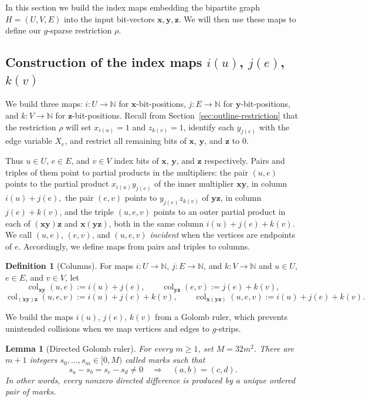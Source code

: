 \documentclass[11pt]{article}
\newtheorem{lemma}[theorem]{Lemma}
\theoremstyle{definition}
\newtheorem{definition}[theorem]{Definition}
\theoremstyle{remark}
\newcommand{\N}{\mathbb{N}}
\newcommand{\col}{\operatorname{col}}
\newcommand{\vv}[1]{\mathbf{#1}}
\begin{document}
In this section we build the index maps embedding the bipartite graph $H=(U,V,E)$ into the input bit-vectors $\vv{x},\vv{y},\vv{z}$. We will then use these maps to define our $g$-sparse restriction $\rho$.

\subsection{Construction of the index maps \texorpdfstring{$i(u)$, $j(e)$, $k(v)$}{i(u), j(e), k(v)}}
\label{sec:embedding}

We build
three maps: $i:U\to\N$ for $\vv{x}$-bit-positions, $j:E\to\N$ for $\vv{y}$-bit-positions, and $k:V\to\N$ for $\vv{z}$-bit-positions. Recall
from Section~\ref{sec:outline-restriction} that the restriction $\rho$ will set $x_{i(u)}=1$ and $z_{k(v)}=1$, identify each $y_{j(e)}$ with
the edge variable $X_e$, and restrict all remaining bits of $\vv{x}$, $\vv{y}$, and $\vv{z}$ to $0$.

Thus $u\in U$, $e\in E$, and $v\in V$ index bits of $\vv{x}$,
$\vv{y}$, and $\vv{z}$ respectively. Pairs and triples of them point to
partial products in the multipliers: the pair $(u,e)$ points to the partial product
$x_{i(u)}y_{j(e)}$ of the inner multiplier $\vv{x}\vv{y}$, in column
$
i(u)+j(e),
$
the pair $(e,v)$ points to $y_{j(e)}z_{k(v)}$ of $\vv{y}\vv{z}$, in
column $j(e)+k(v)$, and the triple $(u,e,v)$
points to an outer partial product in each of $(\vv{x}\vv{y})\vv{z}$
and $\vv{x}(\vv{y}\vv{z})$, both in the same column
$
i(u)+j(e)+k(v).
$
We call $(u,e)$, $(e,v)$, and $(u,e,v)$ \emph{incident} when the vertices are endpoints of $e$.
Accordingly, we define maps from pairs and triples to columns.
\begin{definition}[Columns]
	\label{def:columns}
	For maps $i:U\to\N$, $j:E\to\N$, and $k:V\to\N$ and
	$u\in U$, $e\in E$, and $v\in V$, let
	\[
	\col_{\vv{xy}}(u,e):=i(u)+j(e),\qquad
	\col_{\vv{yz}}(e,v):=j(e)+k(v),
	\]
	\[
	\col_{(\vv{x}\vv{y})\vv{z}}(u,e,v):=i(u)+j(e)+k(v),\qquad
	\col_{\vv{x}(\vv{y}\vv{z})}(u,e,v):=i(u)+j(e)+k(v).
	\]
\end{definition}


We build the maps $i(u)$, $j(e)$, $k(v)$ from a Golomb ruler, which prevents unintended collisions when we map vertices and edges to $g$-strips.

\begin{lemma}[Directed Golomb ruler]
\label{lem:golomb}
For every $m\ge1$, set $M=32m^2$. There are $m+1$ integers $s_0,\ldots,s_m\in[0,M)$ called \emph{marks} such that
\[
s_a-s_b=s_c-s_d\ne0\quad\Longrightarrow\quad (a,b)=(c,d).
\]
In other words, every nonzero directed difference is produced by a unique ordered pair of marks.
\end{lemma}
\end{document}
